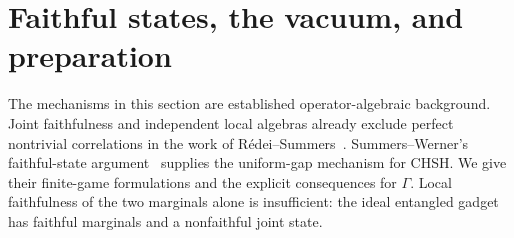 \section{Faithful states, the vacuum, and preparation}\label{sec:faithfulness}
The mechanisms in this section are established operator-algebraic background. Joint faithfulness and independent local algebras already exclude perfect nontrivial correlations in the work of R\'edei--Summers~\cite[proof of Lemma 3, equations (18)--(19)]{RedeiSummers}. Summers--Werner's faithful-state argument~\cite[Theorem 2.1]{SW88} supplies the uniform-gap mechanism for CHSH. We give their finite-game formulations and the explicit consequences for $\Gamma$. Local faithfulness of the two marginals alone is insufficient: the ideal entangled gadget has faithful marginals and a nonfaithful joint state.

